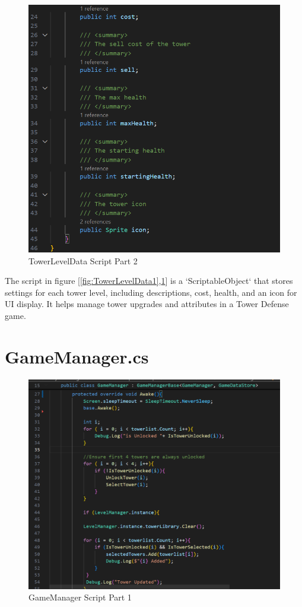 \documentclass[12pt,a4paper]{report}
\begin{document}
\begin{figure}[h!]
	\centering
	\includegraphics[scale=0.75]{images/TowerLevelData2.png}
	\caption{TowerLevelData Script Part 2}
	\label{fig:TowerLevelData2}
\end{figure}

The script in figure [\ref{fig:TowerLevelData1},\ref{fig:TowerLevelData2}] is a `ScriptableObject` that stores settings for each tower level, including descriptions, cost, health, and an icon for UI display. It helps manage tower upgrades and attributes in a Tower Defense game.


\section{GameManager.cs}

\begin{figure}[h!]
	\centering
	\includegraphics[scale=0.75]{images/GameManager1.png}
	\caption{GameManager Script Part 1}
	\label{fig:GameManager1}
\end{figure}
\end{document}
